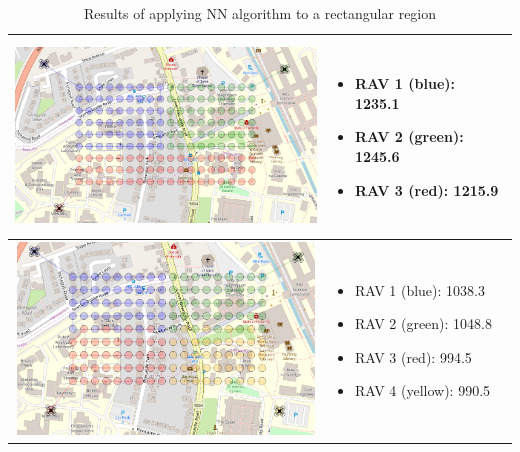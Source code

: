 \begin{table}[ht!]
\begin{tabular}{ | c | m{5cm} | }
    \begin{minipage}[c][53mm][c]{.6\textwidth}
      \includegraphics[width=\linewidth, height=51mm]{Chapters/MultiAgentCoverage/MultipleTravellingSalesman/Figs/Rectangle/ThreeAgent.PNG}
    \end{minipage}
    &
    \begin{itemize}[leftmargin=*]
    \item[] RAV 1 (blue): 1235.1
    \item[] RAV 2 (green): 1245.6
    \item[] RAV 3 (red): 1215.9
    \end{itemize}
    \\
    \hline
    
    \begin{minipage}[c][53mm][c]{.6\textwidth}
      \includegraphics[width=\linewidth, height=51mm]{Chapters/MultiAgentCoverage/MultipleTravellingSalesman/Figs/Rectangle/FourAgent.PNG}
    \end{minipage}
    &
    \begin{itemize}[leftmargin=*]
    \item[] RAV 1 (blue): 1038.3
    \item[] RAV 2 (green): 1048.8
    \item[] RAV 3 (red): 994.5
    \item[] RAV 4 (yellow): 990.5
    \end{itemize}

    \\
    \hline
  \end{tabular}
  \caption{Results of applying NN algorithm to a rectangular region}\label{table:NNAlgoResultsRect}
\end{table}


